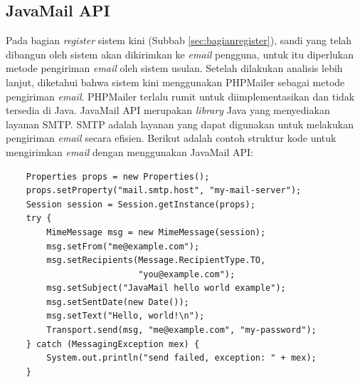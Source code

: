 \subsection{JavaMail API}
\label{sec:javamailapi}
Pada bagian \textit{register} sistem kini (Subbab \ref{sec:bagianregister}), sandi yang telah dibangun oleh sistem akan dikirimkan ke \textit{email} pengguna, untuk itu diperlukan metode pengiriman \textit{email} oleh sistem usulan. Setelah dilakukan analisis lebih lanjut, diketahui bahwa sistem kini menggunakan PHPMailer\cite{github} sebagai metode pengiriman \textit{email}. PHPMailer terlalu rumit untuk diimplementasikan dan tidak tersedia di Java. JavaMail API merupakan \textit{library} Java yang menyediakan layanan SMTP\cite{javamailapi}. SMTP adalah layanan yang dapat digunakan untuk melakukan pengiriman \textit{email} secara efisien\cite{smtp}. Berikut adalah contoh struktur kode untuk mengirimkan \textit{email} dengan menggunakan JavaMail API:
\begin{lstlisting}
	Properties props = new Properties();
    props.setProperty("mail.smtp.host", "my-mail-server");
    Session session = Session.getInstance(props);
    try {
        MimeMessage msg = new MimeMessage(session);
        msg.setFrom("me@example.com");
        msg.setRecipients(Message.RecipientType.TO,
                          "you@example.com");
        msg.setSubject("JavaMail hello world example");
        msg.setSentDate(new Date());
        msg.setText("Hello, world!\n");
        Transport.send(msg, "me@example.com", "my-password");
    } catch (MessagingException mex) {
        System.out.println("send failed, exception: " + mex);
    }
\end{lstlisting}

